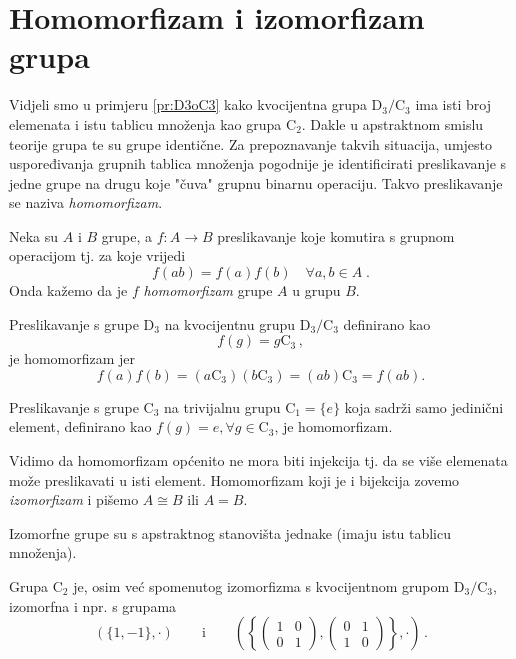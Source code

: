 \section{Homomorfizam i izomorfizam grupa}

Vidjeli smo u primjeru \ref{pr:D3oC3} kako kvocijentna grupa $\mathrm{D}_3/\mathrm{C}_3$
ima isti broj elemenata i istu tablicu množenja kao grupa $\mathrm{C}_2$. Dakle u
apstraktnom smislu teorije grupa te su grupe identične.  Za prepoznavanje takvih
situacija, umjesto uspoređivanja grupnih tablica množenja pogodnije je identificirati
preslikavanje s jedne grupe na drugu koje "čuva" grupnu binarnu operaciju. Takvo preslikavanje
se naziva \emph{homomorfizam}. 
\begin{definicija}[Homomorfizam]
Neka su $A$ i $B$ grupe, a $f:A\to B$ preslikavanje koje komutira
s grupnom operacijom tj. za koje vrijedi
\begin{displaymath}
      f(ab)=f(a)f(b) \quad \forall a,b\in A \;.
\end{displaymath}
Onda kažemo da je $f$ \emph{homomorfizam} grupe $A$ u grupu $B$.
\end{definicija}

\begin{primjer}   
    Preslikavanje s grupe $\mathrm{D}_3$ na kvocijentnu grupu
    $\mathrm{D}_3/\mathrm{C}_3$ definirano kao 
    \[
        f(g) = g\mathrm{C}_3 \,,
    \] je homomorfizam jer
    \[
        f(a) f(b) = (a \mathrm{C}_3) (b \mathrm{C}_3 ) =
        (a b) \mathrm{C}_3 = f(a b)
    .\] 
\end{primjer}
\begin{primjer}
    Preslikavanje s grupe $\mathrm{C}_3$ na trivijalnu grupu $\mathrm{C}_1 = \{e\}$
    koja sadrži samo jedinični element, definirano kao $f(g) = e,
    \forall g\in\mathrm{C}_3$, je homomorfizam.
    \label{pr:C3toC1}
\end{primjer}

Vidimo da homomorfizam općenito ne mora biti injekcija tj. da se više
elemenata može preslikavati u isti element.
Homomorfizam koji je i bijekcija zovemo \emph{izomorfizam} i
pišemo $A\cong B$ ili $A=B$.

Izomorfne grupe su s apstraktnog stanovišta jednake (imaju
istu tablicu množenja).

\begin{primjer} 
Grupa C$_2$ je, osim već spomenutog izomorfizma s
kvocijentnom grupom $\mathrm{D}_3/\mathrm{C}_3$, izomorfna i
npr. s grupama 
$$
(\{1, -1\},\cdot) \qquad \text{i} \qquad \left(\left\{
\begin{pmatrix}
1 & 0 \\ 0 & 1
\end{pmatrix},
\begin{pmatrix}
0 & 1 \\ 1 & 0
\end{pmatrix}
\right\},\cdot\right)\,.$$
\end{primjer}

